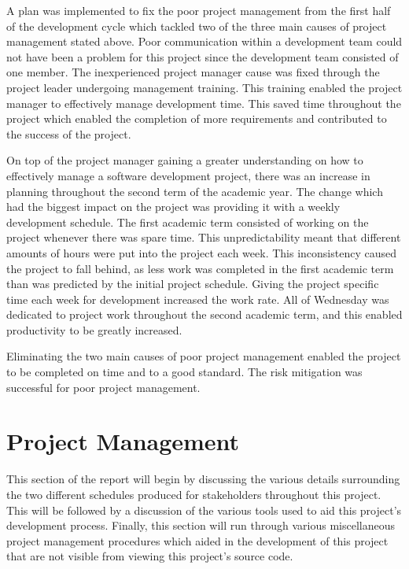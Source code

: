 \documentclass{article}
\begin{document}
A plan was implemented to fix the poor project management from the first half of the development cycle which tackled two of the three main causes of project management stated above. Poor communication within a development team could not have been a problem for this project since the development team consisted of one member. The inexperienced project manager cause was fixed through the project leader undergoing management training. This training enabled the project manager to effectively manage development time. This saved time throughout the project which enabled the completion of more requirements and contributed to the success of the project. \par

On top of the project manager gaining a greater understanding on how to effectively manage a software development project, there was an increase in planning throughout the second term of the academic year. The change which had the biggest impact on the project was providing it with a weekly development schedule. The first academic term consisted of working on the project whenever there was spare time. This unpredictability meant that different amounts of hours were put into the project each week. This inconsistency caused the project to fall behind, as less work was completed in the first academic term than was predicted by the initial project schedule. Giving the project specific time each week for development increased the work rate. All of Wednesday was dedicated to project work throughout the second academic term, and this enabled productivity to be greatly increased. \par

Eliminating the two main causes of poor project management enabled the project to be completed on time and to a good standard. The risk mitigation was successful for poor project management. \par

\section{Project Management}
\label{section:projectManagement}

This section of the report will begin by discussing the various details surrounding the two different schedules produced for stakeholders throughout this project. This will be followed by a discussion of the various tools used to aid this project's development process. Finally, this section will run through various miscellaneous project management procedures which aided in the development of this project that are not visible from viewing this project's source code. \par
\end{document}
